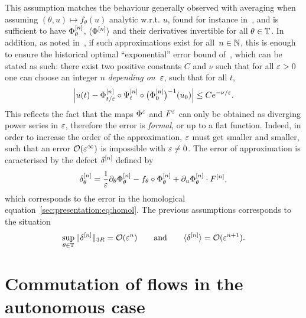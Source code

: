 This assumption matches the behaviour generally observed with averaging
when assuming $(\theta,u) \mapsto f_\theta(u)$ analytic w.r.t. $u$,
found for instance in~\cite{castella.2015.stroboscopic}, and is
sufficient to have $\Phi^{[n]} _\theta$, $\langle \Phi ^{[n]} \rangle$ and their
derivatives invertible for all $\theta \in \mathbb{T}$. In addition, as noted
in~\cite{chartier.2015.higher}, if such approximations exist for all~$n
\in \mathbb{N}$, this is enough to ensure the historical optimal
``exponential'' error bound of~\cite{neishtadt.1984.separation}, which
can be stated as such: there exist two positive constants $C$ and $\nu$
such that for all $\varepsilon > 0$ one can choose an integer $n$
\textit{depending on}~$\varepsilon$, such that for all $t$,
\begin{equation*}
  \left| u(t) - \Phi^{[n]} _{t/\varepsilon} \circ \Psi^{[n]}_t 
  \circ \big( \Phi^{[n]} _0 \big)^{-1} (u_0) \right| 
  \leq C e^{-\nu/\varepsilon} .
\end{equation*}
This reflects the fact that the maps $\Phi^\varepsilon$ and $F^\varepsilon$ can only
be obtained as diverging power series in $\varepsilon$, therefore the error is
\textit{formal}, or up to a flat function. Indeed, in order to increase
the order of the approximation, $\varepsilon$ must get smaller and smaller,
such that an error $\mathcal{O}( \varepsilon^\infty )$ is impossible with $\varepsilon \neq
0$. The error of approximation is caracterised by the defect $\delta^{[n]}$ defined by
\begin{equation*} 
  \delta^{[n]} _{\theta} 
  = \frac{1}{\varepsilon} \partial_\theta \Phi^{[n]} _\theta
    - f_\theta \circ \Phi^{[n]} _\theta 
    + \partial_u \Phi^{[n]} _\theta \cdot F^{[n]} , 
\end{equation*}
which corresponds to the error in the homological
equation~\eqref{sec:presentation:eq:homol}. The previous assumptions
corresponds to the situation
\begin{equation} \label{sec:approx:hyp:delta}
  \sup_{\theta \in \mathbb{T}} \| \delta^{[n]} \| _{3R} = \mathcal{O}( \varepsilon^n )
  \qquad\text{and}\qquad
  \langle \delta^{[n]} \rangle = \mathcal{O}( \varepsilon^{n+1} ) .
\end{equation}


\section{Commutation of flows in the autonomous case} 
\label{sec:autonomous}

